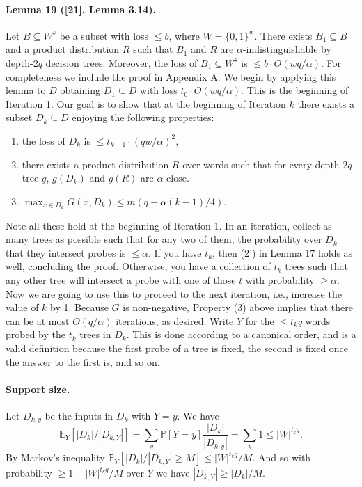 \documentclass[10pt,a4paper]{article}
\begin{document}
\paragraph{Lemma 19 ([21], Lemma 3.14).}
Let $B\subseteq W^s$ be a subset with loss $\leq b$, where $W=\{0,1\}^w$. There exists $B_1\subseteq B$ and a product distribution $R$ such that $B_1$ and $R$ are $\alpha$-indistinguishable by depth-$2q$ decision trees. Moreover, the loss of $B_1\subseteq W^s$ is $\leq b\cdot O(wq/\alpha)$.
For completeness we include the proof in Appendix A.
We begin by applying this lemma to $D$ obtaining $D_1\subseteq D$ with loss $t_0\cdot O(wq/\alpha)$. This is the beginning of Iteration 1.
Our goal is to show that at the beginning of Iteration $k$ there exists a subset $D_k\subseteq D$ enjoying the following properties:
\begin{enumerate}
\item[(1)] [in Theorem 16] the loss of $D_k$ is $\leq t_{k-1}\cdot(qw/\alpha)^2$,
\item[(2'')] [in Lemma 17] there exists a product distribution $R$ over words such that for every depth-$2q$ tree $g$, $g(D_k)$ and $g(R)$ are $\alpha$-close.
\item[(3)] $\max_{x\in D_k}G(x,D_k)\leq m(q-\alpha(k-1)/4)$.
\end{enumerate}
Note all these hold at the beginning of Iteration 1.
In an iteration, collect as many trees as possible such that for any two of them, the probability over $D_k$ that they intersect probes is $\leq\alpha$. If you have $t_k$, then (2') in Lemma 17 holds as well, concluding the proof.
Otherwise, you have a collection of $t_k$ trees such that any other tree will intersect a probe with one of those $t$ with probability $\geq\alpha$. Now we are going to use this to proceed to the next iteration, i.e., increase the value of $k$ by 1. Because $G$ is non-negative, Property (3) above implies that there can be at most $O(q/\alpha)$ iterations, as desired.
Write $Y$ for the $\leq t_kq$ words probed by the $t_k$ trees in $D_k$. This is done according to a canonical order, and is a valid definition because the first probe of a tree is fixed, the second is fixed once the answer to the first is, and so on.
\paragraph{Support size.}
Let $D_{k,y}$ be the inputs in $D_k$ with $Y=y$. We have
\[\mathbb E_Y[|D_k|/|D_{k,Y}|]=\sum_y\mathbb P[Y=y]\frac{|D_k|}{|D_{k,y}|}=\sum_y1\leq|W|^{t_kq}.\]
By Markov's inequality $\mathbb P_Y[|D_k|/|D_{k,Y}|\geq M]\leq|W|^{t_kq}/M$. And so with probability $\geq1-|W|^{t_kq}/M$ over $Y$ we have $|D_{k,Y}|\geq|D_k|/M$.
\end{document}
